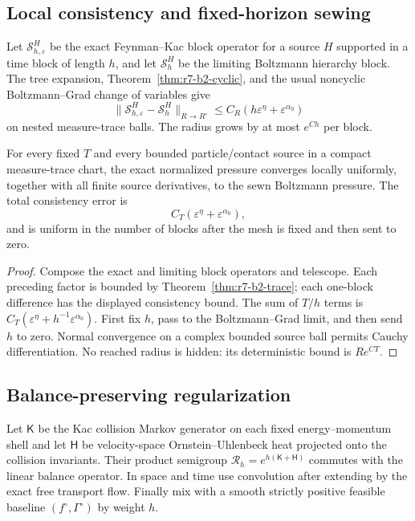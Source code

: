 \subsection{Local consistency and fixed-horizon sewing}

Let $\mathcal S_{h,\varepsilon}^H$ be the exact Feynman--Kac block operator for
a source $H$ supported in a time block of length $h$, and let
$\mathcal S_h^H$ be the limiting Boltzmann hierarchy block.  The tree expansion,
Theorem~\ref{thm:r7-b2-cyclic}, and the usual noncyclic Boltzmann--Grad change
of variables give
\[
 \|\mathcal S_{h,\varepsilon}^H-\mathcal S_h^H\|_{R\to R'}
 \le C_R(h\varepsilon^\eta+\varepsilon^{\alpha_0})
\]
on nested measure-trace balls.  The radius grows by at most $e^{Ch}$ per
block.

\begin{theorem}
\label{thm:r7-b2-pressure}
For every fixed $T$ and every bounded particle/contact source in a compact
measure-trace chart, the exact normalized pressure converges locally uniformly,
together with all finite source derivatives, to the sewn Boltzmann pressure.
The total consistency error is
\[
 C_T(\varepsilon^\eta+\varepsilon^{\alpha_0}),
\]
and is uniform in the number of blocks after the mesh is fixed and then sent
to zero.
\end{theorem}

\begin{proof}
Compose the exact and limiting block operators and telescope.  Each preceding
factor is bounded by Theorem~\ref{thm:r7-b2-trace}; each one-block difference
has the displayed consistency bound.  The sum of $T/h$ terms is
$C_T(\varepsilon^\eta+h^{-1}\varepsilon^{\alpha_0})$.  First fix $h$, pass to
the Boltzmann--Grad limit, and then send $h$ to zero.  Normal convergence on a
complex bounded source ball permits Cauchy differentiation.  No reached radius
is hidden: its deterministic bound is $R e^{CT}$.
\end{proof}

\subsection{Balance-preserving regularization}

Let $\mathsf K$ be the Kac collision Markov generator on each fixed
energy--momentum shell and let $\mathsf H$ be velocity-space Ornstein--Uhlenbeck
heat projected onto the collision invariants.  Their product semigroup
$\mathcal R_h=e^{h(\mathsf K+\mathsf H)}$ commutes with the linear balance
operator.  In space and time use convolution after extending by the exact free
transport flow.  Finally mix with a smooth strictly positive feasible baseline
$(f^\circ,\Gamma^\circ)$ by weight $h$.

